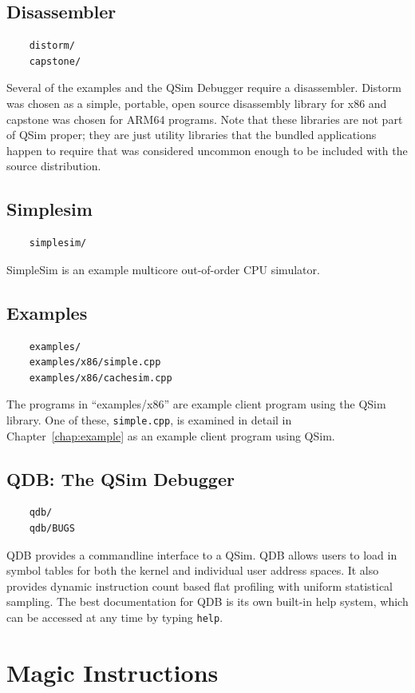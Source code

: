 \documentclass[letterpaper, 10pt]{book}
\begin{document}
\subsection{Disassembler}
\begin{verbatim}
    distorm/
    capstone/
\end{verbatim}
Several of the examples and the QSim Debugger require a disassembler. Distorm 
was chosen as a simple, portable, open source disassembly library for x86 and
capstone was chosen for ARM64 programs. Note that these libraries are
not part of QSim proper; they are just utility libraries that the bundled
applications happen to require that was considered uncommon enough to be
included with the source distribution.

\subsection{Simplesim}
\begin{verbatim}
    simplesim/
\end{verbatim}
SimpleSim is an example multicore out-of-order CPU simulator.

\subsection{Examples}
\begin{verbatim}
    examples/
    examples/x86/simple.cpp
    examples/x86/cachesim.cpp
\end{verbatim}
The programs in ``examples/x86'' are example client program using the QSim library. One of
these, \texttt{simple.cpp}, is examined in detail in Chapter~\ref{chap:example} 
as an example client program using QSim.

\subsection{QDB: The QSim Debugger}
\begin{verbatim}
    qdb/
    qdb/BUGS
\end{verbatim}
QDB provides a commandline interface to a QSim. QDB allows users to load in
symbol tables for both the kernel and individual user address spaces. It also
provides dynamic instruction count based flat profiling with uniform statistical
sampling. The best documentation for QDB is its own built-in help system, which
can be accessed at any time by typing \texttt{help}.

\section{Magic Instructions} \label{sec:magic}
\end{document}
